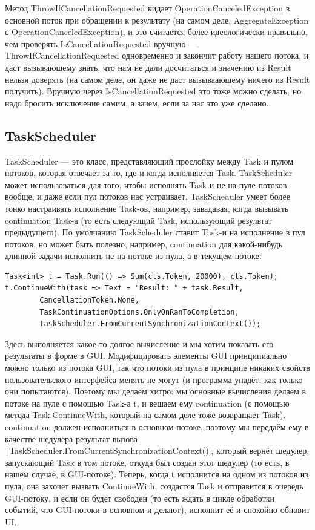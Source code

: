 \documentclass[a5paper]{article}
\begin{document}
Метод ThrowIfCancellationRequested кидает OperationCanceledException в основной поток при обращении к результату (на самом деле, AggregateException с OperationCanceledException), и это считается более идеологически правильно, чем проверять IsCancellationRequested вручную --- ThrowIfCancellationRequested одновременно и закончит работу нашего потока, и даст вызывающему знать, что нам не дали досчитаться и значению из Result нельзя доверять (на самом деле, он даже не даст вызываающему ничего из Result получить). Вручную через IsCancellationRequested это тоже можно сделать, но надо бросить исключение самим, а зачем, если за нас это уже сделано.

\subsection{TaskScheduler}

TaskScheduler --- это класс, представляющий прослойку между Task и пулом потоков, которая отвечает за то, где и когда исполняется Task. TaskScheduler может использоваться для того, чтобы исполнять Task-и не на пуле потоков вообще, и даже если пул потоков нас устраивает, TaskScheduler умеет более тонко настраивать исполнение Task-ов, например, завадавая, когда вызывать continuation Task-а (то есть следующий Task, использующий результат предыдущего). По умолчанию TaskScheduler ставит Task-и на исполнение в пул потоков, но может быть полезно, например, continuation для какой-нибудь длинной задачи исполнить не на потоке из пула, а в текущем потоке:

\begin{verbatim}
Task<int> t = Task.Run(() => Sum(cts.Token, 20000), cts.Token);
t.ContinueWith(task => Text = "Result: " + task.Result,
        CancellationToken.None,
        TaskContinuationOptions.OnlyOnRanToCompletion,
        TaskScheduler.FromCurrentSynchronizationContext());
\end{verbatim}

Здесь выполняется какое-то долгое вычисление и мы хотим показать его результаты в форме в GUI. Модифицировать элементы GUI принципиально можно только из потока GUI, так что потоки из пула в принципе никаких свойств пользовательского интерфейса менять не могут (и программа упадёт, как только они попытаются). Поэтому мы делаем хитро: мы основные вычисления делаем в потоке на пуле с помощью Task-а t, и вешаем ему continuation (с помощью метода Task.ContinueWith, который на самом деле тоже возвращает Task). continuation должен исполниться в основном потоке, поэтому мы передаём ему в качестве шедулера результат вызова \texttt|TaskScheduler.FromCurrentSynchronizationContext()|, который вернёт шедулер, запускающий Task в том потоке, откуда был создан этот шедулер (то есть, в нашем случае, в GUI-потоке). Теперь, когда t исполнится на одном из потоков из пула, она захочет вызвать ContinueWith, создастся Task и отправится в очередь GUI-потоку, и если он будет свободен (то есть ждать в цикле обработки событий, что GUI-потоки в основном и делают), исполнит её и спокойно обновит UI.
\end{document}
